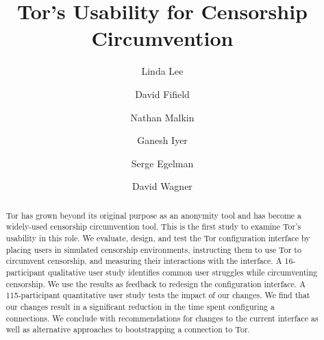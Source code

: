 \documentclass[USenglish,oneside,twocolumn]{article}
\begin{document}
 
  \author*[1]{Linda Lee}

  \author[2]{David Fifield}

  \author[3]{Nathan Malkin}

  \author[4]{Ganesh Iyer}

  \author[5]{Serge Egelman}
  
  \author[6]{David Wagner}




  
   

  \title{\huge Tor's Usability for Censorship Circumvention}



  \begin{abstract}
{Tor has grown beyond its original purpose as an anonymity tool and has 
become a widely-used censorship circumvention tool.
This is the first study to examine Tor's usability in this role.
We evaluate, design, and test the Tor configuration interface by
placing users in simulated censorship environments, instructing them to use Tor
to circumvent censorship, and measuring their interactions with the interface.
A 16-participant qualitative user study identifies common user struggles while circumventing censorship.
We use the results as feedback to redesign the configuration interface.
A 115-participant quantitative user study tests the impact of our changes.
We find that our changes result in a significant reduction 
in the time spent configuring a connections. We
conclude with recommendations for changes to the current interface as well as 
alternative approaches to bootstrapping a connection to Tor.}
\end{abstract}
\end{document}
